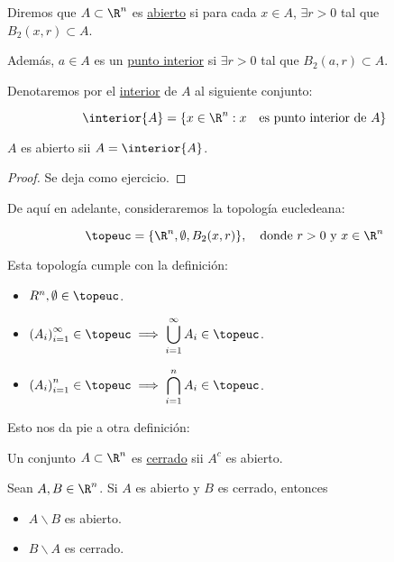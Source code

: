 \begin{defn}
    Diremos que $A \subset \R^n$ es \ul{abierto} si para cada $x \in A$, $\exists r > 0$ tal que $B_2(x,r) \subset A$.
    
    Además, $a \in A$ es un \ul{punto interior} si $\exists r > 0$ tal que $B_2(a,r) \subset A$.
\end{defn}

\begin{defn}
    Denotaremos por el \ul{interior} de $A$ al siguiente conjunto:
    
    \[
    \interior{A} = \{x \in \R^n : x \quad \text{es punto interior de $A$}\}
    \]
\end{defn}

\begin{teo}
    $A$ es abierto sii $A = \interior{A}$.
\end{teo}

\begin{proof}
    Se deja como ejercicio.
\end{proof}

De aquí en adelante, consideraremos la topología eucledeana:

\[
\topeuc = \{\R^n, \emptyset, B_2(x,r)\}, \quad \text{donde $r>0$ y $x \in \R^n$}
\]

Esta topología cumple con la definición:

\begin{itemize}
    \item $R^n, \emptyset \in \topeuc$.
    \item $\displaystyle \left( A_i \right)_{i=1}^{\infty} \in \topeuc \implies \bigcup_{i=1}^{\infty} A_i \in \topeuc$.
    \item $\displaystyle \left( A_i \right)_{i=1}^n \in \topeuc \implies \bigcap_{i=1}^n A_i \in \topeuc$.
\end{itemize}

Esto nos da pie a otra definición:

\begin{defn}
    Un conjunto $A \subset \R^n$ es \ul{cerrado} sii $A^c$ es abierto.
\end{defn}

\begin{pro}
    Sean $A, B \in \R^n$. Si $A$ es abierto y $B$ es cerrado, entonces
    
    \begin{itemize}
        \item $A \backslash B$ es abierto.
        \item $B \backslash A$ es cerrado.
    \end{itemize}
\end{pro}

